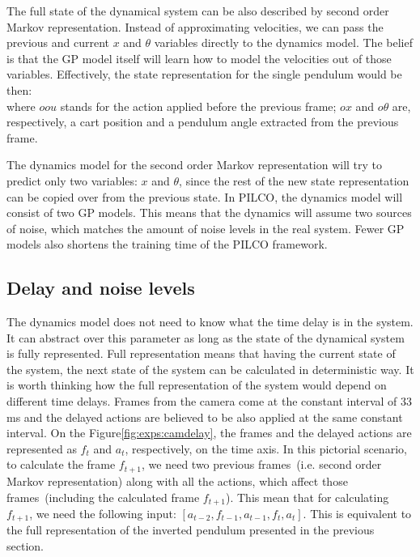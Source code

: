 \noindent The full state of the dynamical system can be also described by second order Markov representation. Instead of
approximating velocities, we can pass the previous and current $x$ and $\theta$ variables directly to the dynamics model. The belief is that the GP model itself will learn how to model the velocities out of those variables. Effectively, the state representation for the single pendulum would be then:
\begin{equation}
[oou, ox, o\theta, ou, x, \theta, u] \nonumber
\end{equation}
where $oou$ stands for the action applied before the previous frame; $ox$ and $o \theta$ are, respectively, a cart position and a pendulum angle extracted from the previous frame. 

\noindent The dynamics model for the second order Markov representation will try to predict only two variables: $x$ and $\theta$, since the rest of the new state representation can be copied over from the previous state. In PILCO, the dynamics model will consist of two GP models. This means that the dynamics will assume two sources of noise, which matches the amount of noise levels in the real system. Fewer GP models also shortens the training time of the PILCO framework.

\subsection{Delay and noise levels}
\label{s:exps:delaynoise}
The dynamics model does not need to know what the time delay is in the system. It can abstract over this parameter as long as the state of the dynamical system is fully represented. Full representation means that having the current state of the system, the next state of the system can be calculated in deterministic way. It is worth thinking how the full representation of the system would depend on different time delays. Frames from the camera come at the constant interval of $33$ ms and the delayed actions are believed to be also applied at the same constant interval. On the Figure\ref{fig:exps:camdelay}, the frames and the delayed actions are represented as $f_{t}$ and $a_{t}$, respectively, on the time axis. In this pictorial scenario, to calculate the frame $f_{t+1}$, we need two previous frames\ (i.e. second order Markov representation) along with all the actions, which affect those frames\ (including the calculated frame $f_{t+1}$). This mean that for calculating $f_{t+1}$, we need the following input: $[a_{t-2}, f_{t-1}, a_{t-1}, f_{t}, a_{t}]$. This is equivalent to the full representation of the inverted pendulum presented in the previous section. 

